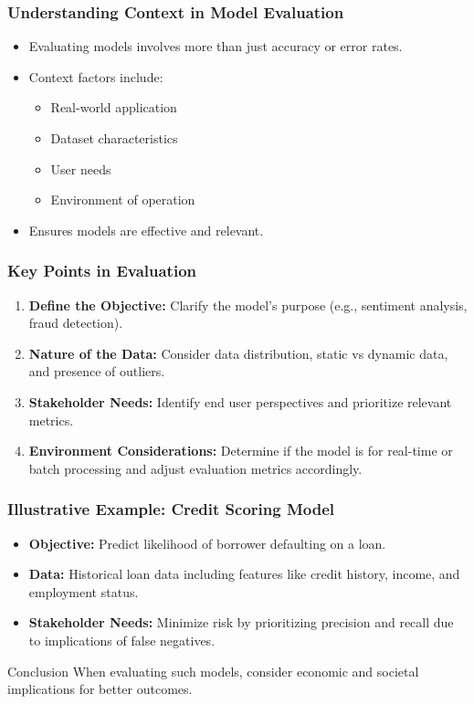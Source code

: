 \documentclass[aspectratio=169]{beamer}
\begin{document}
\begin{frame}[fragile]
    \frametitle{Understanding Context in Model Evaluation}
    \begin{itemize}
        \item Evaluating models involves more than just accuracy or error rates.
        \item Context factors include:
        \begin{itemize}
            \item Real-world application
            \item Dataset characteristics
            \item User needs
            \item Environment of operation
        \end{itemize}
        \item Ensures models are effective and relevant.
    \end{itemize}
\end{frame}

\begin{frame}[fragile]
    \frametitle{Key Points in Evaluation}
    \begin{enumerate}
        \item \textbf{Define the Objective:} Clarify the model's purpose (e.g., sentiment analysis, fraud detection).
        \item \textbf{Nature of the Data:} Consider data distribution, static vs dynamic data, and presence of outliers.
        \item \textbf{Stakeholder Needs:} Identify end user perspectives and prioritize relevant metrics.
        \item \textbf{Environment Considerations:} Determine if the model is for real-time or batch processing and adjust evaluation metrics accordingly.
    \end{enumerate}
\end{frame}

\begin{frame}[fragile]
    \frametitle{Illustrative Example: Credit Scoring Model}
    \begin{itemize}
        \item \textbf{Objective:} Predict likelihood of borrower defaulting on a loan.
        \item \textbf{Data:} Historical loan data including features like credit history, income, and employment status.
        \item \textbf{Stakeholder Needs:} Minimize risk by prioritizing precision and recall due to implications of false negatives.
    \end{itemize}
    \begin{block}{Conclusion}
        When evaluating such models, consider economic and societal implications for better outcomes.
    \end{block}
\end{frame}
\end{document}

